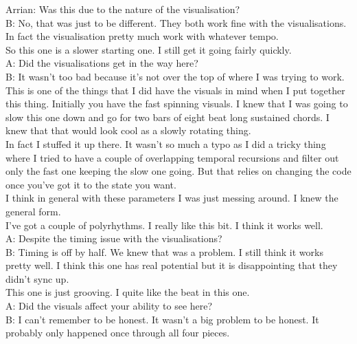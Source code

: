 Arrian: Was this due to the nature of the visualisation?\\

B: No, that was just to be different. They both work fine with the visualisations. In fact the visualisation pretty much work with whatever tempo.\\

So this one is a slower starting one. I still get it going fairly quickly.\\

A: Did the visualisations get in the way here?\\

B: It wasn't too bad because it's not over the top of where I was trying to work.\\

This is one of the things that I did have the visuals in mind when I put together this thing. Initially you have the fast spinning visuals. I knew that I was going to slow this one down and go for two bars of eight beat long sustained chords. I knew that that would look cool as a slowly rotating thing.\\

In fact I stuffed it up there. It wasn't so much a typo as I did a tricky thing where I tried to have a couple of overlapping temporal recursions and filter out only the fast one keeping the slow one going. But that relies on changing the code once you've got it to the state you want.\\

I think in general with these parameters I was just messing around. I knew the general form.\\

I've got a couple of polyrhythms. I really like this bit. I think it works well.\\

A: Despite the timing issue with the visualisations?\\

B: Timing is off by half. We knew that was a problem. I still think it works pretty well. I think this one has real potential but it is disappointing that they didn't sync up.\\

This one is just grooving. I quite like the beat in this one.\\

A: Did the visuals affect your ability to see here?\\

B: I can't remember to be honest. It wasn't a big problem to be honest. It probably only happened once through all four pieces.\\

